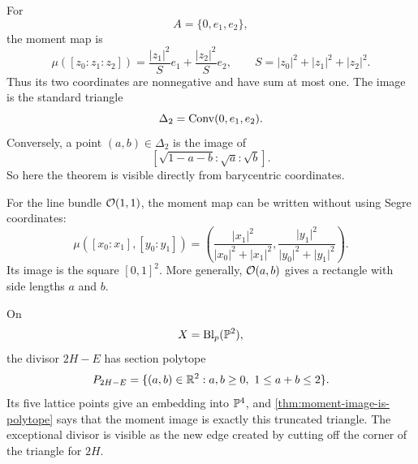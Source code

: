 \begin{example}
\label{ex:moment-triangle-projective-plane}
For
\[
A=\{0,e_1,e_2\},
\]
the moment map is
\[
\mu([z_0:z_1:z_2])
=
\frac{\lvert z_1\rvert^2}{S}e_1
+
\frac{\lvert z_2\rvert^2}{S}e_2,
\qquad
S=\lvert z_0\rvert^2+\lvert z_1\rvert^2+\lvert z_2\rvert^2.
\]
Thus its two coordinates are nonnegative and have sum at most one.
The image is the standard triangle
\[
\Delta_2=\operatorname{Conv}(0,e_1,e_2).
\]
Conversely, a point \((a,b)\in\Delta_2\) is the image of
\[
[\sqrt{1-a-b}:\sqrt a:\sqrt b].
\]
So here the theorem is visible directly from barycentric coordinates.
\end{example}

\begin{example}
\label{ex:moment-rectangle-product-lines}
For the line bundle \(\mathcal{O}(1,1)\), the moment map can be written without
using Segre coordinates:
\[
\mu([x_0:x_1],[y_0:y_1])
=
\left(
\frac{\lvert x_1\rvert^2}{\lvert x_0\rvert^2+\lvert x_1\rvert^2},
\frac{\lvert y_1\rvert^2}{\lvert y_0\rvert^2+\lvert y_1\rvert^2}
\right).
\]
Its image is the square \([0,1]^2\). More generally,
\(\mathcal{O}(a,b)\) gives a rectangle with side lengths \(a\) and \(b\).
\end{example}

\begin{example}
\label{ex:moment-polygon-blowup-projective-plane}
On
\[
X=\operatorname{Bl}_p(\mathbb{P}^2),
\]
the divisor \(2H-E\) has section polytope
\[
P_{2H-E}
=
\{(a,b)\in\mathbb{R}^2:a,b\geq0,\ 1\leq a+b\leq2\}.
\]
Its five lattice points give an embedding into \(\mathbb{P}^4\), and
\cref{thm:moment-image-is-polytope} says that the moment image is
exactly this truncated triangle. The exceptional divisor is visible
as the new edge created by cutting off the corner of the triangle for
\(2H\).
\end{example}

